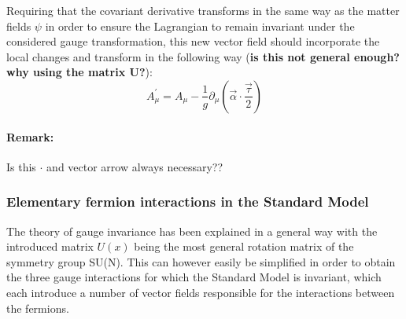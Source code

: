Requiring that the covariant derivative transforms in the same way as the matter fields $\psi$ in order to ensure the Lagrangian to remain invariant under the considered gauge transformation, this new vector field should incorporate the local changes and transform in the following way (\textbf{is this not general enough? why using the matrix U?}):
\begin{equation}
 A_{\mu}^{'} =  A_{\mu} - \frac{1}{g} \partial_{\mu} (\vec{\alpha}\cdot\frac{\vec{\tau}}{2})
\end{equation}
\paragraph{Remark: } Is this $\cdot$ and vector arrow always necessary??

\subsubsection{Elementary fermion interactions in the Standard Model}
The theory of gauge invariance has been explained in a general way with the introduced matrix $U(x)$ being the most general rotation matrix of the symmetry group SU(N). This can however easily be simplified in order to obtain the three gauge interactions for which the Standard Model is invariant, which each introduce a number of vector fields responsible for the interactions between the fermions. 

